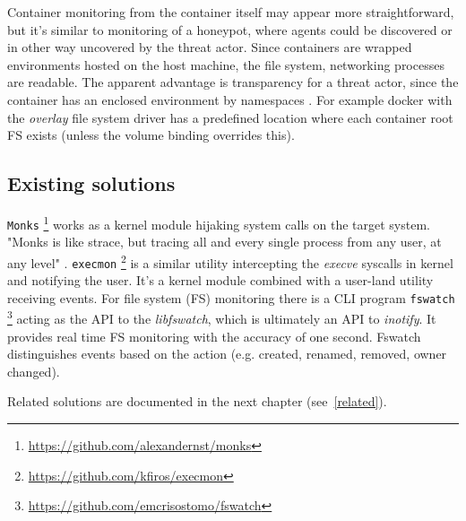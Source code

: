 Container monitoring from the container itself may appear more straightforward, but it's similar to monitoring of a honeypot, where agents could be discovered or in other way uncovered by the threat actor. Since containers are wrapped environments hosted on the host machine, the file system, networking processes are readable. The apparent advantage is transparency for a threat actor, since the container has an enclosed environment by namespaces \cite{blog:containers}. For example docker with the \textit{overlay} file system driver has a predefined location where each container root FS exists (unless the volume binding overrides this).

\subsection{Existing solutions \label{anal:mon:exist}}
\texttt{Monks} \footnote{\url{https://github.com/alexandernst/monks}} works as a kernel module hijaking system calls on the target system. "Monks is like strace, but tracing all and every single process from any user, at any level" \cite{git:monks}. \texttt{execmon} \footnote{\url{https://github.com/kfiros/execmon}} is a similar utility intercepting the \textit{execve} syscalls in kernel and notifying the user. It's a kernel module combined with a user-land utility receiving events. For file system (FS) monitoring there is a CLI program \texttt{fswatch} \footnote{\url{https://github.com/emcrisostomo/fswatch}} acting as the API to the \textit{libfswatch}, which is ultimately an API to \textit{inotify}. It provides real time FS monitoring with the accuracy of one second. Fswatch distinguishes events based on the action (e.g. created, renamed, removed, owner changed).

Related solutions are documented in the next chapter (see~\autoref{related}).